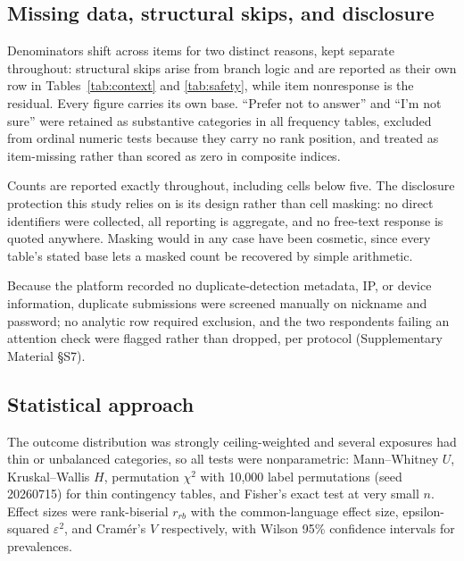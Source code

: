 \documentclass[12pt]{article}
\begin{document}
\subsection{Missing data, structural skips, and disclosure}

Denominators shift across items for two distinct reasons, kept separate throughout: structural skips arise
from branch logic and are reported as their own row in Tables~\ref{tab:context} and \ref{tab:safety}, while
item nonresponse is the residual. Every figure carries its own base. ``Prefer not to answer'' and ``I'm not
sure'' were retained as substantive categories in all frequency tables, excluded from ordinal numeric tests
because they carry no rank position, and treated as item-missing rather than scored as zero in composite
indices.

Counts are reported exactly throughout, including cells below five. The disclosure protection this study
relies on is its design rather than cell masking: no direct identifiers were collected, all reporting is
aggregate, and no free-text response is quoted anywhere. Masking would in any case have been cosmetic, since every table's stated base lets a masked count be
recovered by simple arithmetic.

Because the platform recorded no duplicate-detection metadata, IP, or device information, duplicate
submissions were screened manually on nickname and password; no analytic row required exclusion, and the
two respondents failing an attention check were flagged rather than dropped, per protocol (Supplementary
Material \S S7).

\subsection{Statistical approach}

The outcome distribution was strongly ceiling-weighted and several exposures had thin or unbalanced
categories, so all tests were nonparametric: Mann--Whitney $U$, Kruskal--Wallis $H$, permutation $\chi^2$
with 10,000 label permutations (seed 20260715) for thin contingency tables, and Fisher's exact test at very
small $n$. Effect sizes were rank-biserial $r_{rb}$ with the common-language effect size, epsilon-squared
$\varepsilon^2$, and Cram\'er's $V$ respectively, with Wilson 95\% confidence intervals for prevalences.
\end{document}
